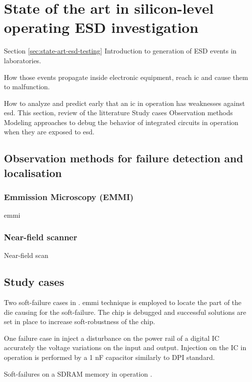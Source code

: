\section{State of the art in silicon-level operating ESD investigation}

Section \ref{sec:state-art-esd-testing}
Introduction to generation of ESD events in laboratories.

How those events propagate inside electronic equipment, reach \gls{ic} and cause them to malfunction.

How to analyze and predict early that an \gls{ic} in operation has weaknesses against \gls{esd}.
This section, review of the litterature
Study cases
Observation methods
Modeling approaches to debug the behavior of integrated circuits in operation when they are exposed to \gls{esd}.

\subsection{Observation methods for failure detection and localisation}

\subsubsection{Emmission Microscopy (EMMI)}
\gls{emmi}

\subsubsection{Near-field scanner}
Near-field scan

\subsection{Study cases}

Two soft-failure cases in \cite{systemLevelESDIC}.
\gls{emmi} technique is employed to locate the part of the die causing for the soft-failure.
The chip is debugged and successful solutions are set in place to increase soft-robustness of the chip.

One failure case in \cite{LacrampeTransientImmunity}
inject a disturbance on the power rail of a digital IC
accurately the voltage variations on the input and output.
Injection on the IC in operation is performed by a 1 nF capacitor similarly to DPI standard.

Soft-failures on a SDRAM memory in operation \cite{SDRAMCase}.

